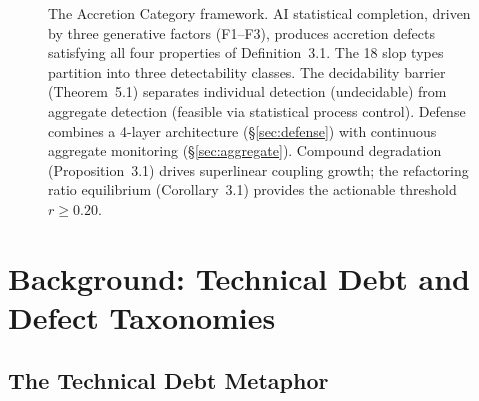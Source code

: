 \documentclass[11pt, a4paper, copyright]{googledeepmind}
\begin{document}
\begin{figure}[p]
\caption{The Accretion Category framework. AI statistical completion, driven by three generative factors (F1--F3), produces accretion defects satisfying all four properties of Definition~3.1. The 18 slop types partition into three detectability classes. The decidability barrier (Theorem~5.1) separates individual detection (undecidable) from aggregate detection (feasible via statistical process control). Defense combines a 4-layer architecture (\S\ref{sec:defense}) with continuous aggregate monitoring (\S\ref{sec:aggregate}). Compound degradation (Proposition~3.1) drives superlinear coupling growth; the refactoring ratio equilibrium (Corollary~3.1) provides the actionable threshold $r \geq 0.20$.}
\label{fig:framework}
\end{figure}

\section{Background: Technical Debt and Defect Taxonomies}
\label{sec:background}

\subsection{The Technical Debt Metaphor}
\end{document}
